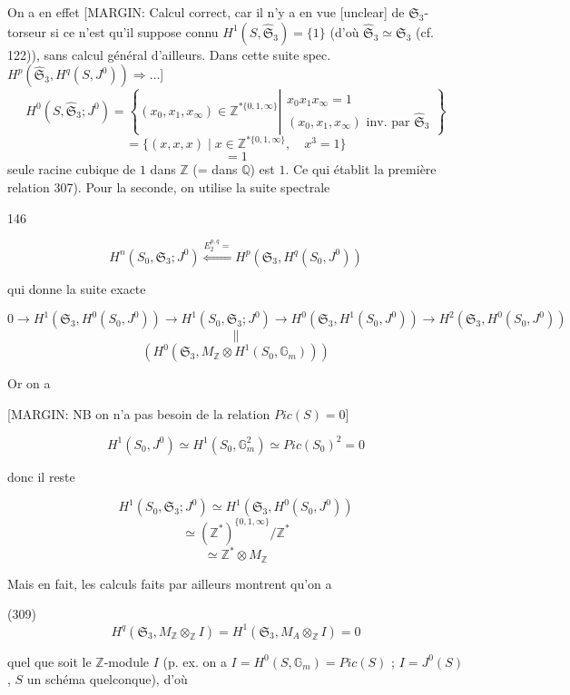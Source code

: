 On a en effet
[MARGIN: Calcul correct, car il n'y a en vue [unclear] de $\widehat{\mathfrak{S}}_3$-torseur si ce n'est qu'il suppose connu $H^1(S, \widehat{\mathfrak{S}}_3) = \{1\}$ (d'où $\widehat{\mathfrak{S}}_3 \simeq \mathfrak{S}_3$ (cf. 122)), sans calcul général d'ailleurs. Dans cette suite spec. $H^p(\widehat{\mathfrak{S}}_3, H^q(S, J^0)) \Rightarrow \dots$]
$$H^0(S, \widehat{\mathfrak{S}}_3; J^0) = \left\{ (x_0, x_1, x_\infty) \in \mathbb{Z}^{* \{0,1,\infty\}} \left| \begin{array}{l} x_0 x_1 x_\infty = 1 \\ (x_0, x_1, x_\infty) \text{ inv. par } \widehat{\mathfrak{S}}_3 \end{array} \right. \right\}$$
$$= \{ (x, x, x) \mid x \in \mathbb{Z}^{* \{0,1,\infty\}}, \quad x^3 = 1 \}$$
$$= 1$$
seule racine cubique de $1$ dans $\mathbb{Z}$ (= dans $\mathbb{Q}$) est $1$. Ce qui établit la première relation 307). Pour la seconde, on utilise la suite spectrale

146

\newpage


$$H^n(S_0, \mathfrak{S}_3 ; J^0) \stackrel{E^{p,q}_2=}{\Longleftarrow} H^p(\mathfrak{S}_3, H^q(S_0, J^0))$$

qui donne la suite exacte

$$0 \to H^1(\mathfrak{S}_3, H^0(S_0, J^0)) \to H^1(S_0, \mathfrak{S}_3 ; J^0) \to H^0(\mathfrak{S}_3, H^1(S_0, J^0)) \to H^2(\mathfrak{S}_3, H^0(S_0, J^0))$$
$$ \parallel $$
$$ (H^0(\mathfrak{S}_3, M_{\mathbb{Z}} \otimes H^1(S_0, \mathbb{G}_m))) $$

Or on a

[MARGIN: NB on n'a pas besoin de la relation $Pic(S)=0$]

$$H^1(S_0, J^0) \simeq H^1(S_0, \mathbb{G}_m^2) \simeq Pic(S_0)^2 = 0$$

donc il reste

$$H^1(S_0, \mathfrak{S}_3 ; J^0) \simeq H^1(\mathfrak{S}_3, H^0(S_0, J^0))$$
$$ \simeq (\mathbb{Z}^*)^{\{0,1,\infty\}} / \mathbb{Z}^* $$
$$ \simeq \mathbb{Z}^* \otimes M_{\mathbb{Z}} $$

Mais en fait, les calculs faits
par ailleurs montrent qu'on a

(309) $$H^q(\mathfrak{S}_3, M_{\mathbb{Z}} \otimes_{\mathbb{Z}} I) = H^1(\mathfrak{S}_3, M_A \otimes_{\mathbb{Z}} I) = 0$$

quel que soit le $\mathbb{Z}$-module $I$ (p. ex.
on a $I = H^0(S, \mathbb{G}_m) = Pic(S)$ ;
$I = J^0(S)$, $S$ un schéma quelconque), d'où

